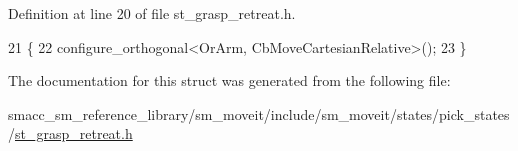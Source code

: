 Definition at line 20 of file st\+\_\+grasp\+\_\+retreat.\+h.


\begin{DoxyCode}
21     \{
22         configure\_orthogonal<OrArm, CbMoveCartesianRelative>();
23     \}
\end{DoxyCode}


The documentation for this struct was generated from the following file\+:\begin{DoxyCompactItemize}
\item 
smacc\+\_\+sm\+\_\+reference\+\_\+library/sm\+\_\+moveit/include/sm\+\_\+moveit/states/pick\+\_\+states/\hyperlink{st__grasp__retreat_8h}{st\+\_\+grasp\+\_\+retreat.\+h}\end{DoxyCompactItemize}
